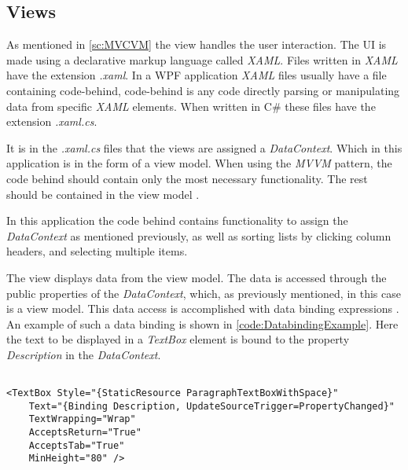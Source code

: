 \subsection{Views} \label{ssc:Views}
As mentioned in \autoref{sc:MVCVM} the view handles the user interaction. The UI is made using a declarative markup language called \textit{XAML}. Files written in \textit{XAML} have the extension \textit{.xaml}. In a WPF application \textit{XAML} files usually have a file containing code-behind, code-behind is any code directly parsing or manipulating data from specific \textit{XAML} elements. When written in C\# these files have the extension \textit{.xaml.cs}. \citep{XamlOverview}\par

It is in the \textit{.xaml.cs} files that the views are assigned a \textit{DataContext}. Which in this application is in the form of a view model.
When using the \textit{MVVM} pattern, the code behind should contain only the most necessary functionality. The rest should be contained in the view model \citep{WPFandMVVM}.
\par

In this application the code behind contains functionality to assign the \textit{DataContext} as mentioned previously, as well as sorting lists by clicking column headers, and selecting multiple items.


\par

The view displays data from the view model. The data is accessed through the public properties of the \textit{DataContext}, which, as previously mentioned, in this case is a view model. This data access is accomplished with data binding expressions \citep{Bindings}.
\\
An example of such a data binding is shown in \autoref{code:DatabindingExample}. Here the text to be displayed in a \textit{TextBox} element is bound to the property \textit{Description} in the \textit{DataContext}.

\begin{listing}[H]
\begin{verbatim}

<TextBox Style="{StaticResource ParagraphTextBoxWithSpace}"
    Text="{Binding Description, UpdateSourceTrigger=PropertyChanged}"
    TextWrapping="Wrap"
    AcceptsReturn="True"
    AcceptsTab="True"
    MinHeight="80" />

\end{verbatim}
\label{code:DatabindingExample}
\end{listing}
\par

